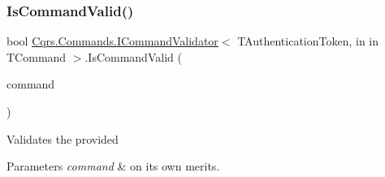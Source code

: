 \subsubsection{\texorpdfstring{Is\+Command\+Valid()}{IsCommandValid()}}
{\footnotesize\ttfamily bool \hyperlink{interfaceCqrs_1_1Commands_1_1ICommandValidator}{Cqrs.\+Commands.\+I\+Command\+Validator}$<$ T\+Authentication\+Token, in in T\+Command $>$.Is\+Command\+Valid (\begin{DoxyParamCaption}\item[{T\+Command}]{command }\end{DoxyParamCaption})}



Validates the provided 
\begin{DoxyParams}{Parameters}
{\em command} & on its own merits. \\
\hline
\end{DoxyParams}


